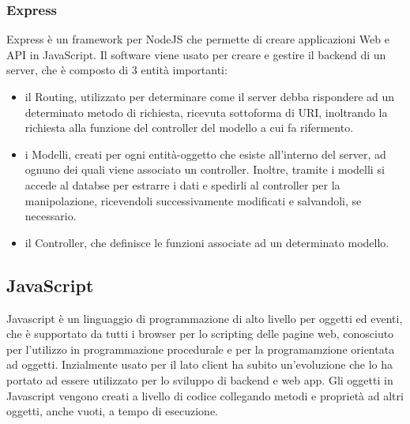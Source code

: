 \subsubsection{Express}
Express \`e un framework per NodeJS che permette di creare applicazioni Web e API in JavaScript.
Il software viene usato per creare e gestire il backend di un server, che \`e composto di 3 entit\`a importanti:
\begin{itemize}
\item il Routing, utilizzato per determinare come il server debba rispondere ad un determinato metodo di richiesta,
ricevuta sottoforma di URI, inoltrando la richiesta alla funzione del controller del modello a cui fa rifermento.
\item i Modelli, creati per ogni entit\`a-oggetto che esiste all'interno del server, ad ognuno dei quali viene associato
un controller. Inoltre, tramite i modelli si accede al databse per estrarre i dati e spedirli al controller per
la manipolazione, ricevendoli successivamente modificati e salvandoli, se necessario.
\item il Controller, che definisce le funzioni associate ad un determinato modello.
\\[2\baselineskip]
\end{itemize}

\subsection{JavaScript}
Javascript \`e un linguaggio di programmazione di alto livello per oggetti ed eventi, che \`e supportato da tutti i browser
per lo scripting delle pagine web, conosciuto per l'utilizzo in programmazione procedurale e per la programamzione orientata ad oggetti.
Inzialmente usato per il lato client ha subito un'evoluzione che lo ha portato ad essere utilizzato per lo sviluppo di backend e web app.
Gli oggetti in Javascript vengono creati a livello di codice collegando metodi e propriet\`a ad altri oggetti, anche vuoti, a tempo
di esecuzione.

